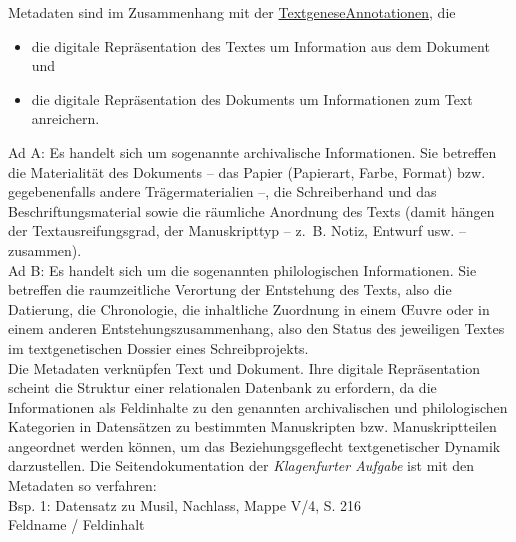 \documentclass{article}
\begin{document}
    Metadaten sind im Zusammenhang mit der \href{http://gams.uni-graz.at/o:konde.28}{Textgenese}\href{http://gams.uni-graz.at/o:konde.17}{Annotationen}, die\\
            
        \begin{itemize}\item {die digitale Repräsentation des Textes um Information aus dem Dokument und }\item {die digitale Repräsentation des Dokuments um Informationen zum Text
                     anreichern.}\end{itemize}Ad A: Es handelt sich um sogenannte archivalische Informationen. Sie betreffen die
                  Materialität des Dokuments – das Papier (Papierart, Farbe, Format) bzw.
                  gegebenenfalls andere Trägermaterialien –, die Schreiberhand und das
                  Beschriftungsmaterial sowie die räumliche Anordnung des Texts (damit hängen der
                  Textausreifungsgrad, der Manuskripttyp – z. B. Notiz, Entwurf usw. –
                  zusammen).\\
            
        Ad B: Es handelt sich um die sogenannten philologischen Informationen. Sie
                  betreffen die raumzeitliche Verortung der Entstehung des Texts, also die
                  Datierung, die Chronologie, die inhaltliche Zuordnung in einem Œuvre oder in einem
                  anderen Entstehungszusammenhang, also den Status des jeweiligen Textes im
                  textgenetischen Dossier eines Schreibprojekts.\\
            
        Die Metadaten verknüpfen Text und Dokument. Ihre digitale Repräsentation scheint
                  die Struktur einer relationalen Datenbank zu erfordern, da die Informationen als
                  Feldinhalte zu den genannten archivalischen und philologischen Kategorien in
                  Datensätzen zu bestimmten Manuskripten bzw. Manuskriptteilen angeordnet werden
                  können, um das Beziehungsgeflecht textgenetischer Dynamik darzustellen. Die
                  Seitendokumentation der \emph{Klagenfurter Aufgabe} ist mit den
                  Metadaten so verfahren: \\
            
        Bsp. 1: Datensatz zu Musil, Nachlass, Mappe V/4, S. 216\\
            
        Feldname / Feldinhalt\\
            
\end{document}
